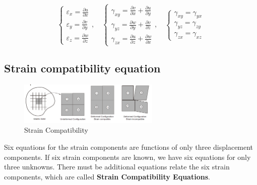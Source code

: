 \documentclass[en,hazy,cyan,8pt,normal]{elegantnote}
\numberwithin{equation}{section}
\begin{document}
    \begin{equation}\label{eq:042}
      \left\{
      \begin{aligned}
        \displaystyle \varepsilon_x=\frac{\partial u}{\partial x}\\
        \displaystyle \varepsilon_y=\frac{\partial v}{\partial y}\\
        \displaystyle \varepsilon_z=\frac{\partial w}{\partial z}
      \end{aligned}
      \right.
      , \quad
      \left\{
      \begin{aligned}
        \displaystyle \gamma_{xy}=\frac{\partial v}{\partial x} + \frac{\partial u}{\partial y}\\
        \displaystyle \gamma_{yz}=\frac{\partial w}{\partial y} + \frac{\partial v}{\partial z}\\
        \displaystyle \gamma_{zx}=\frac{\partial u}{\partial z} + \frac{\partial w}{\partial x}
      \end{aligned}
      \right.
      , \quad
      \left\{
      \begin{aligned}
        \displaystyle \gamma_{xy}=\gamma_{yx}\\
        \displaystyle \gamma_{yz}=\gamma_{zy}\\
        \displaystyle \gamma_{zx}=\gamma_{xz}
      \end{aligned}
      \right.
    \end{equation}

  \subsection{Strain compatibility equation}\label{subsec:02.03}
    \begin{figure}[H]
      \centering
      \includegraphics[width=0.6\textwidth]{image/012.png}
      \caption{Strain Compatibility}
      \label{fig:012}
    \end{figure}

    Six equations for the strain components are functions of only three displacement components. If six strain components are known, we have six equations for only three unknowns. There must be additional equations relate the six strain components, which are called \textbf{Strain Compatibility Equations}.\\
\end{document}
